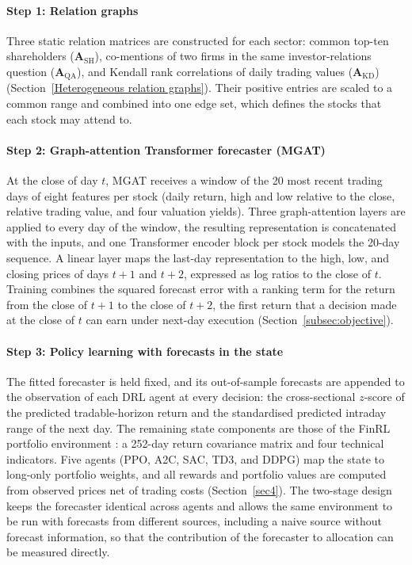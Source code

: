 \documentclass[pdflatex,sn-mathphys-num]{sn-jnl}%
\theoremstyle{thmstyleone}%
\theoremstyle{thmstyletwo}%
\theoremstyle{thmstylethree}%
\begin{document}
\paragraph{Step 1: Relation graphs}
{\color{blue}Three static relation matrices are constructed for each sector: common top-ten shareholders ($\mathbf{A}_{\mathrm{SH}}$), co-mentions of two firms in the same investor-relations question ($\mathbf{A}_{\mathrm{QA}}$), and Kendall rank correlations of daily trading values ($\mathbf{A}_{\mathrm{KD}}$) (Section~\ref{Heterogeneous relation graphs}). Their positive entries are scaled to a common range and combined into one edge set, which defines the stocks that each stock may attend to.\par}

\paragraph{Step 2: Graph-attention Transformer forecaster (MGAT)}
{\color{blue}At the close of day $t$, MGAT receives a window of the 20 most recent trading days of eight features per stock (daily return, high and low relative to the close, relative trading value, and four valuation yields). Three graph-attention layers are applied to every day of the window, the resulting representation is concatenated with the inputs, and one Transformer encoder block per stock models the 20-day sequence. A linear layer maps the last-day representation to the high, low, and closing prices of days $t+1$ and $t+2$, expressed as log ratios to the close of $t$. Training combines the squared forecast error with a ranking term for the return from the close of $t+1$ to the close of $t+2$, the first return that a decision made at the close of $t$ can earn under next-day execution (Section~\ref{subsec:objective}).\par}

\paragraph{Step 3: Policy learning with forecasts in the state}
{\color{blue}The fitted forecaster is held fixed, and its out-of-sample forecasts are appended to the observation of each DRL agent at every decision: the cross-sectional $z$-score of the predicted tradable-horizon return and the standardised predicted intraday range of the next day. The remaining state components are those of the FinRL portfolio environment \citep{Liu2021FinRL}: a 252-day return covariance matrix and four technical indicators. Five agents (PPO, A2C, SAC, TD3, and DDPG) map the state to long-only portfolio weights, and all rewards and portfolio values are computed from observed prices net of trading costs (Section~\ref{sec4}). The two-stage design keeps the forecaster identical across agents and allows the same environment to be run with forecasts from different sources, including a naive source without forecast information, so that the contribution of the forecaster to allocation can be measured directly.\par}
\end{document}

